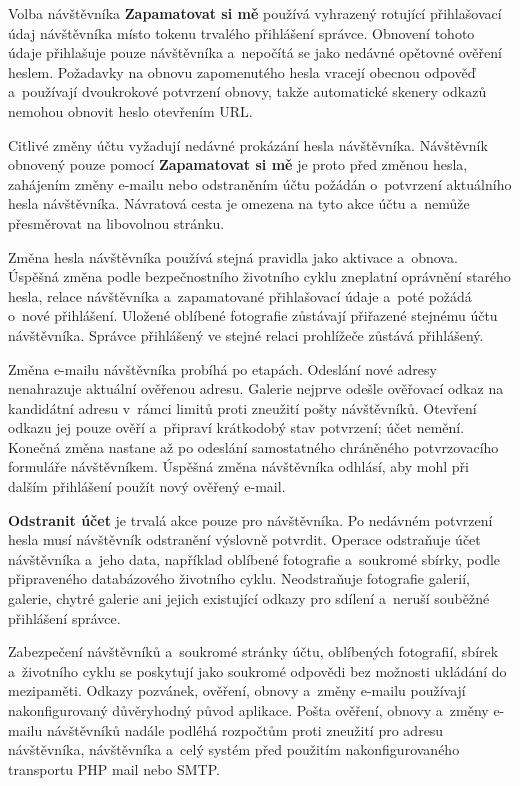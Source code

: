 \documentclass[11pt,a4paper]{article}
\newcommand{\ui}[1]{\textbf{#1}}
\begin{document}
Volba návštěvníka \ui{Zapamatovat si mě} používá vyhrazený rotující přihlašovací
údaj návštěvníka místo tokenu trvalého přihlášení správce. Obnovení tohoto údaje
přihlašuje pouze návštěvníka a~nepočítá se jako nedávné opětovné ověření heslem.
Požadavky na obnovu zapomenutého hesla vracejí obecnou odpověď a~používají
dvoukrokové potvrzení obnovy, takže automatické skenery odkazů nemohou obnovit
heslo otevřením URL.

Citlivé změny účtu vyžadují nedávné prokázání hesla návštěvníka. Návštěvník
obnovený pouze pomocí \ui{Zapamatovat si mě} je proto před změnou hesla,
zahájením změny e-mailu nebo odstraněním účtu požádán o~potvrzení aktuálního
hesla návštěvníka. Návratová cesta je omezena na tyto akce účtu a~nemůže
přesměrovat na libovolnou stránku.

Změna hesla návštěvníka používá stejná pravidla jako aktivace a~obnova. Úspěšná
změna podle bezpečnostního životního cyklu zneplatní oprávnění starého hesla,
relace návštěvníka a~zapamatované přihlašovací údaje a~poté požádá o~nové
přihlášení. Uložené oblíbené fotografie zůstávají přiřazené stejnému účtu
návštěvníka. Správce přihlášený ve stejné relaci prohlížeče zůstává přihlášený.

Změna e-mailu návštěvníka probíhá po etapách. Odeslání nové adresy nenahrazuje
aktuální ověřenou adresu. Galerie nejprve odešle ověřovací odkaz na kandidátní
adresu v~rámci limitů proti zneužití pošty návštěvníků. Otevření odkazu jej
pouze ověří a~připraví krátkodobý stav potvrzení; účet nemění. Konečná změna
nastane až po odeslání samostatného chráněného potvrzovacího formuláře
návštěvníkem. Úspěšná změna návštěvníka odhlásí, aby mohl při dalším přihlášení
použít nový ověřený e-mail.

\ui{Odstranit účet} je trvalá akce pouze pro návštěvníka. Po nedávném potvrzení
hesla musí návštěvník odstranění výslovně potvrdit. Operace odstraňuje účet
návštěvníka a~jeho data, například oblíbené fotografie a~soukromé sbírky, podle
připraveného databázového životního cyklu. Neodstraňuje fotografie galerií,
galerie, chytré galerie ani jejich existující odkazy pro sdílení a~neruší
souběžné přihlášení správce.

Zabezpečení návštěvníků a~soukromé stránky účtu, oblíbených fotografií, sbírek
a~životního cyklu se poskytují jako soukromé odpovědi bez možnosti ukládání do
mezipaměti. Odkazy pozvánek, ověření, obnovy a~změny e-mailu používají
nakonfigurovaný důvěryhodný původ aplikace. Pošta ověření, obnovy a~změny
e-mailu návštěvníků nadále podléhá rozpočtům proti zneužití pro adresu
návštěvníka, návštěvníka a~celý systém před použitím nakonfigurovaného
transportu PHP mail nebo SMTP.
\end{document}
